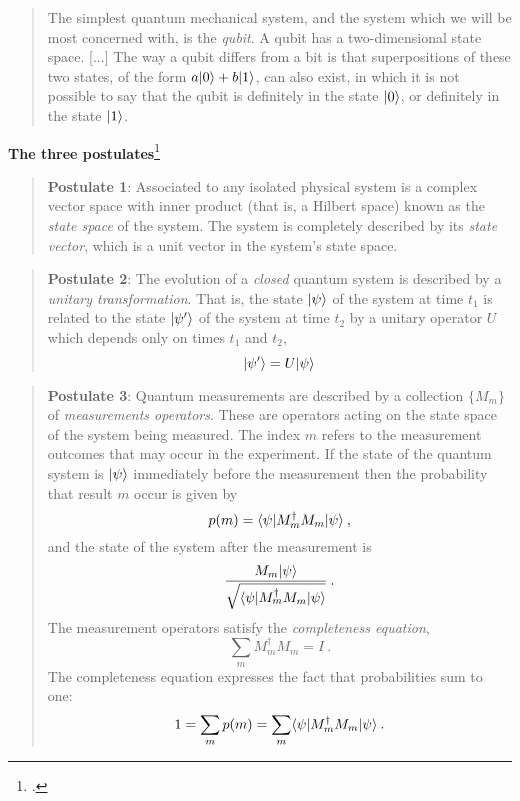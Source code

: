 
\begin{quotation}
	The simplest quantum mechanical system, and the system which we will be most concerned with, is the \emph{qubit}. A qubit has a two-dimensional state space. [...] 
	The way a qubit differs from a bit is that superpositions of these two states, of the form $a|0 \rangle + b|1 \rangle$, can also exist, in which it is not possible to say that the qubit is definitely in the state $|0 \rangle$, or definitely in the state $|1 \rangle$.
	\cite{NC10}
\end{quotation}

\large{\textbf{The three postulates}}\footcite{NC10}
	\begin{quote}
		\textbf{Postulate 1}: Associated to any isolated physical system is a complex vector space with inner product (that is, a Hilbert space) known as the \emph{state space} of the system. 
		The system is completely described by its \emph{state vector}, which is a unit vector in the system's state space. 
	\end{quote}
	
	\begin{quote}
		\textbf{Postulate 2}: The evolution of a \emph{closed} quantum system is described by a \emph{unitary transformation}. That is, the state $|\psi \rangle$ of the system at time $t_1$ is related to the state $|\psi' \rangle$ of the system at time $t_2$ by a unitary operator $U$ which depends only on times $t_1$ and $t_2$,
		$$ |\psi' \rangle = U|\psi \rangle $$
	\end{quote}
	
	\begin{quote}
		\textbf{Postulate 3}: Quantum measurements are described by a collection $\{M_m\}$ of \emph{measurements operators}. 
		These are operators acting on the state space of the system being measured. 
		The index $m$ refers to the measurement outcomes that may occur in the experiment. If the state of the quantum system is $|\psi \rangle$ immediately before the measurement then the probability that result $m$ occur is given by 
		$$ p(m) = \langle \psi|M_m^{\dagger}M_m|\psi \rangle \: ,$$
		and the state of the system after the measurement is 
		$$ \frac{M_m|\psi \rangle}{\sqrt{\langle \psi|M_m^{\dagger}M_m|\psi \rangle}} \: . $$
		The measurement operators satisfy the \emph{completeness equation},
		$$\sum_m  M_m^{\dagger}M_m = I \: .$$
		The completeness equation expresses the fact that probabilities sum to one:
		$$ 1 = \sum_m p(m) = \sum_m  \langle \psi|M_m^{\dagger}M_m|\psi \rangle \: .$$ 
	\end{quote}
	
